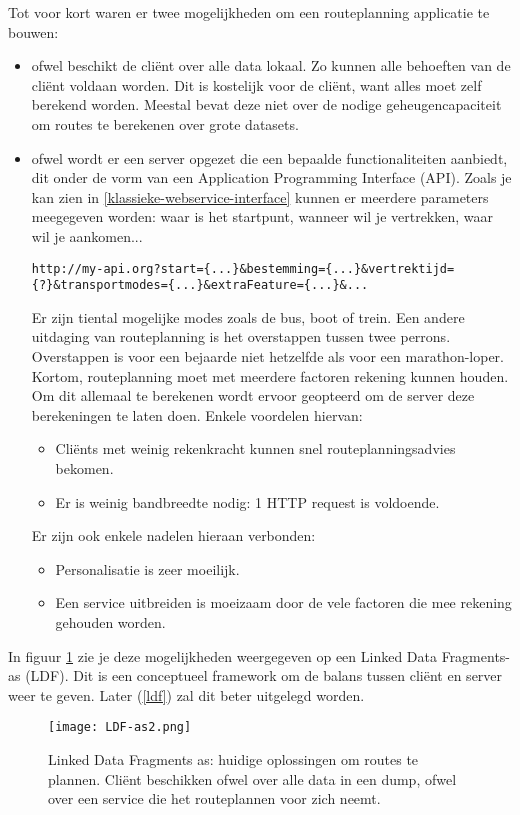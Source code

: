 Tot voor kort waren er twee mogelijkheden om een routeplanning applicatie te bouwen:
\begin{itemize}
\item ofwel beschikt de cli\"ent over alle data lokaal. Zo kunnen alle behoeften van de cli\"ent voldaan worden. Dit is kostelijk voor de cli\"ent, want alles moet zelf berekend worden. Meestal bevat deze niet over de nodige geheugencapaciteit om routes te berekenen over grote datasets.
\item ofwel wordt er een server opgezet die een bepaalde functionaliteiten aanbiedt, dit onder de vorm van een  Application Programming Interface (API). Zoals je kan zien in \ref{klassieke-webservice-interface} kunnen er meerdere parameters meegegeven worden: waar is het startpunt, wanneer wil je vertrekken, waar wil je aankomen...
\begin{lstlisting}[label=klassieke-webservice-interface,caption=Klassieke webservice interface]
http://my-api.org?start={...}&bestemming={...}&vertrektijd={?}&transportmodes={...}&extraFeature={...}&...
\end{lstlisting}
Er zijn tiental mogelijke modes zoals de bus, boot of trein. Een andere uitdaging van routeplanning is het overstappen tussen twee perrons. Overstappen is voor een bejaarde niet hetzelfde als voor een marathon-loper. Kortom, routeplanning moet met meerdere factoren rekening kunnen houden. Om dit allemaal te berekenen wordt ervoor geopteerd om de server deze berekeningen te laten doen.
Enkele voordelen hiervan:
\begin{itemize}
\item Cli\"ents met weinig rekenkracht kunnen snel routeplanningsadvies bekomen.
\item Er is weinig bandbreedte nodig: 1 HTTP request is voldoende.
\end{itemize}
Er zijn ook enkele nadelen hieraan verbonden:
\begin{itemize}
\item Personalisatie is zeer moeilijk.
\item Een service uitbreiden is moeizaam door de vele factoren die mee rekening gehouden worden.\end{itemize}
\end{itemize}

In figuur \ref{probleemrouteplanning} zie je deze mogelijkheden weergegeven op een Linked Data Fragments-as (LDF). Dit is een conceptueel framework om de balans tussen cli\"ent en server weer te geven. Later (\ref{ldf}) zal dit beter uitgelegd worden.
 \begin{figure}[h!]
\centering
\texttt{[image: LDF-as2.png]}
\caption{Linked Data Fragments as: huidige oplossingen om routes te plannen. Cli\"ent beschikken ofwel over alle data in een dump, ofwel over een service die het routeplannen voor zich neemt.}
\label{probleemrouteplanning}
\end{figure}


